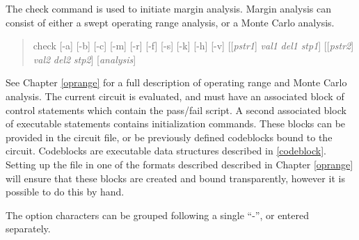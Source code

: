 
The {\cb check} command is used to initiate margin analysis.  Margin
analysis can consist of either a swept operating range analysis, or
a Monte Carlo analysis.
\begin{quote}
{\vt check} [{\vt -a}] [{\vt -b}] [{\vt -c}] [{\vt -m}] [{\vt -r}]
  [{\vt -f}] [{\vt -s}] [{\vt -k}] [{\vt -h}] [{\vt -v}]
  [[{\it pstr1\/}] {\it val1} {\it del1} {\it stp1\/}]
  [[{\it pstr2\/}] {\it val2} {\it del2} {\it stp2\/}]
  [{\it analysis\/}]
\end{quote}
See Chapter \ref{oprange} for a full description of operating range
and Monte Carlo analysis.  The current circuit is evaluated, and must
have an associated block of control statements which contain the
pass/fail script.  A second associated block of executable statements
contains initialization commands.  These blocks can be provided in the
circuit file, or be previously defined codeblocks bound to the
circuit.  Codeblocks are executable data structures described in
\ref{codeblock}.  Setting up the file in one of the formats described
described in Chapter \ref{oprange} will ensure that these blocks are
created and bound transparently, however it is possible to do this by
hand.

The option characters can be grouped following a single ``{\vt -}'',
or entered separately.

